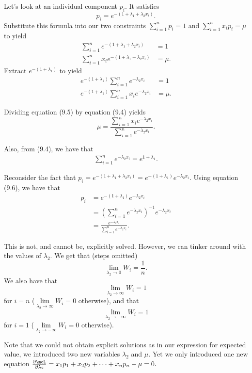\documentclass[a4paper, 12pt,oneside,openany]{book}
\begin{document}
Let's look at an individual component $p_i$. It satisfies \begin{equation} p_i = e^{-(1+\lambda_1+\lambda_2 x_i)}. \end{equation} Substitute this formula into our two constraints $\sum\limits_{i=1}^n p_i=1$ and $\sum\limits_{i=1}^n x_ip_i=\mu$ to yield \begin{align} \sum\limits_{i=1}^n e^{-(1+\lambda_1+\lambda_2 x_i)}&=1 \\ \sum\limits_{i=1}^n x_i e^{-(1+\lambda_1+\lambda_2 x_i)}&=\mu. \end{align} Extract $e^{-(1+\lambda_1)}$ to yield \begin{align} e^{-(1+\lambda_1)} \sum\limits_{i=1}^n e^{-\lambda_2 x_i}&=1 \\ e^{-(1+\lambda_1)} \sum\limits_{i=1}^n x_i e^{-\lambda_2 x_i} &=\mu. \end{align} 

Dividing equation (9.5) by equation (9.4) yields $$\mu = \dfrac{\sum\limits_{i=1}^n x_i e^{-\lambda_2 x_i}}{\sum\limits_{i=1}^n e^{-\lambda_2 x_i}}.$$

Also, from (9.4), we have that \begin{align} \sum\limits_{i=1}^n e^{-\lambda_2 x_i}=e^{1+\lambda_1}. \end{align}

Reconsider the fact that $p_i = e^{-(1+\lambda_1+\lambda_2 x_i)} = e^{-(1+\lambda_1)} e^{-\lambda_2x_i}.$ Using equation (9.6), we have that \begin{align*} p_i &= e^{-(1+\lambda_1)} e^{-\lambda_2x_i}\\ &= \left(\sum\limits_{i=1}^n e^{-\lambda_2 x_i}\right)^{-1} e^{-\lambda_2x_i} \\ &= \frac{e^{-\lambda_2x_i}}{\sum\limits_{i=1}^n e^{-\lambda_2 x_i}}. \end{align*}

This is not, and cannot be, explicitly solved. However, we can tinker around with the values of $\lambda_2$. We get that (steps omitted) $$\lim\limits_{\lambda_2 \to 0} W_i = \frac{1}{n}.$$ We also have that $$\lim\limits_{\lambda_2 \to \infty} W_i=1$$ for $i=n$ ($\lim\limits_{\lambda_2 \to \infty} W_i=0$ otherwise), and that $$\lim\limits_{\lambda_2 \to -\infty} W_i=1$$ for $i=1$ ($\lim\limits_{\lambda_2 \to -\infty} W_i=0$ otherwise).

Note that we could not obtain explicit solutions as in our expression for expected value, we introduced two new variables $\lambda_2$ and $\mu$. Yet we only introduced one new equation $\frac{\partial \mcL}{\partial \lambda_2} = x_1p_1+x_2p_2+\dots+x_np_n-\mu=0.$
\end{document}
